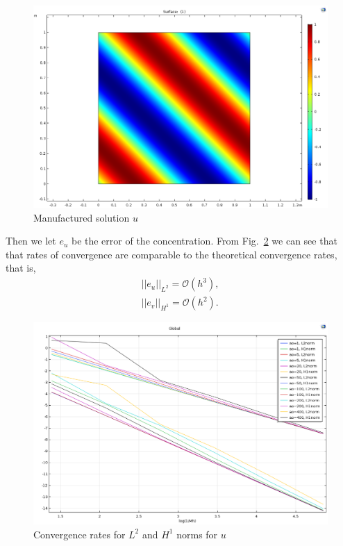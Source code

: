 \begin{figure}
    \centering
    \includegraphics[scale=.5]{Chapter-3/Figures/tauex-MSu.png}
    \caption{Manufactured solution $u$}
    \label{fig:sad msu}
\end{figure}
Then we let $e_u$ be the error of the concentration. From Fig.~\ref{fig:sad conv} we can see that that rates of convergence are comparable to the theoretical convergence rates, that is,
\begin{align}
    ||e_u||_{L^2} = \mathcal{O}(h^3),\\ ||e_v||_{H^1} = \mathcal{O}(h^2).
\end{align}
\begin{figure}
    \centering
    \includegraphics[scale=.5]{Chapter-3/Figures/tauex-conv.png}
    \caption{Convergence rates for $L^2$ and $H^1$ norms for $u$}
    \label{fig:sad conv}
\end{figure}
